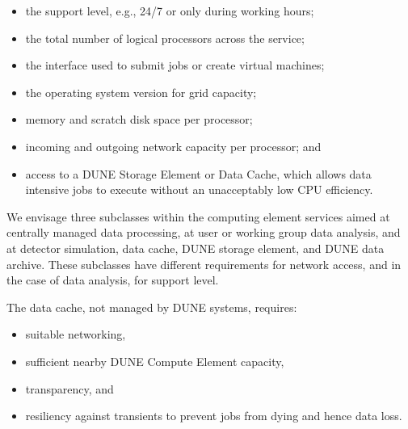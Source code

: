 \documentclass[../main-v1.tex]{subfiles}
\begin{document}
\begin{itemize}
    \item %
    the support level, e.g., 24/7 or only during working hours;
    \item the total number of logical processors across the service;
    \item the interface used to submit jobs or create virtual machines;
    \item the operating system version for grid capacity;
    \item memory and scratch disk space per processor;
    \item incoming and outgoing network capacity per processor; and
    \item %
    access to a DUNE Storage Element or Data Cache, which allows data intensive jobs to execute without an unacceptably low CPU efficiency.
\end{itemize}

We envisage three subclasses within the computing element services aimed at centrally managed data processing, at user or working group data analysis, and at detector simulation, data cache, DUNE storage element, and DUNE data archive. These subclasses have different requirements for network access, and in the case of data analysis, for support level.

The data cache, not managed by DUNE systems, requires:
\begin{itemize}
\item suitable networking,
\item sufficient nearby DUNE Compute Element capacity,
\item transparency, and
\item resiliency against transients to prevent jobs from dying and hence data loss.
\end{itemize}

\end{document}

